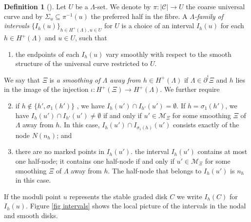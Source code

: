 \documentclass[11pt]{amsart}
\theoremstyle{definition}
\newtheorem{definition}[dummy]{Definition}
\theoremstyle{remark}
\newcommand{\<}{\left<}
\renewcommand{\>}{\right>}
\numberwithin{equation}{section}
\begin{document}
\begin{definition}[{\cite[Definition 3.4]{BCT2}}]
Let $U$ be a $\Lambda$-set. We denote by $\pi:\lvert\mathcal C\rvert\to U$ the coarse universal curve and by $\Sigma_u \subseteq \pi^{-1}(u)$ the preferred half in the fibre. A \textit{$\Lambda$-family of intervals} $\{I_{h}(u)\}_{h\in{H^+}(\Lambda),u\in U}$ for $U$ is a choice of an interval $I_{h}(u)$ for each $h\in{H^+}(\Lambda)$ and $u\in U$, %
such that
\begin{enumerate}
\item
the endpoints %
of each $I_h(u)$ vary smoothly with respect to the smooth structure of the universal curve restricted to $U$.
\end{enumerate}
We say that $\Xi$ is \textit{a smoothing of $\Lambda$ away from $h\in H^+(\Lambda)$} if $\Lambda\in\partial^!\Xi$ and $h$ lies in the image of the injection $\iota:H^+(\Xi)\to H^+(\Lambda)$. We further %
require 
\begin{enumerate}
\setcounter{enumi}{1}
\item
if $h \notin\{ h', \sigma_1(h')\}$%
, we have $I_h(u')\cap I_{h'}(u')=\emptyset$.  If $h=\sigma_1(h')$, we have $I_h(u')\cap I_{h'}(u')\neq\emptyset$ if and only if $u'\in{\mathcal M}_\Xi$ for some smoothing $\Xi$ of $\Lambda$ away from $h$.
  In this case, $I_h(u')\cap I_{\sigma_1(h)}(u')$ consists exactly of the %
node $N(n_{h})$; and
\item there are %
no marked points in $I_h(u')$. the interval $I_h(u')$ contains at most one half-node; it contains one half-node if and only if $u'\in{\mathcal M}_\Xi$ for some smoothing $\Xi$ of $\Lambda$ away from $h$. The half-node that belongs to $I_h(u')$ is $n_{h}$ in this case.
\end{enumerate}

If the moduli point $u$ represents the stable graded %
disk $C$ we %
write $I_h(C)$ for $I_h(u).$ Figure \ref{fig intervals} shows the local picture of the intervals in the nodal and smooth disks.
\end{definition}
\end{document}
